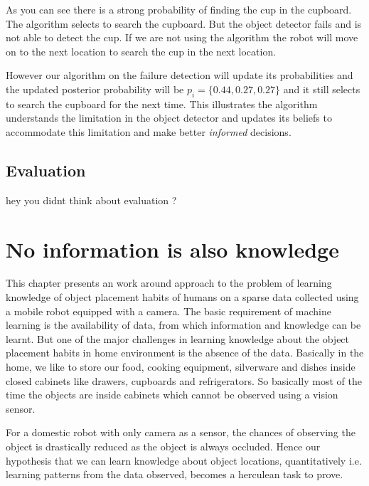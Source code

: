 \documentclass[11pt]{book}
\begin{document}
As you can see there is a strong probability of finding the cup in the cupboard. The algorithm selects to search the cupboard. But the object detector fails and is not able to detect the cup. If we are not using the algorithm the robot will move on to the next location to search the cup in the next location.



However our algorithm on the failure detection will update its probabilities and the updated posterior probability will be $ p_i = \{ 0.44, 0.27, 0.27\}$ and it still selects to search the cupboard for the next time. This illustrates the algorithm understands the limitation in the object detector and updates its beliefs to accommodate this limitation and make better \emph{informed} decisions.  

 
\section{Evaluation}
hey you didnt think about evaluation ? 

\chapter{No information is also knowledge}

This chapter presents an work around approach to the problem of learning knowledge of object placement habits of humans on a sparse data collected using a mobile robot equipped with a camera.
The basic requirement of machine learning is the availability of data, from which information and knowledge can be learnt. But one of the major challenges in learning knowledge about the object placement habits in home environment is the absence of the data. Basically in the home, we like to store our food, cooking equipment, silverware and dishes inside closed cabinets like drawers, cupboards and refrigerators. So basically most of the time the objects are inside cabinets which cannot be observed using a vision sensor. 

For a domestic robot with only camera as a sensor, the chances of observing  the object is drastically reduced as the object is always occluded. Hence our hypothesis that we can learn knowledge about object locations, quantitatively i.e. learning patterns from the data observed, becomes a herculean task to prove.
\end{document}
